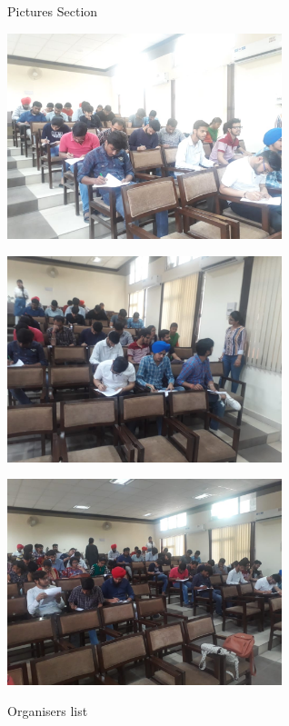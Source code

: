 \documentclass[12pt, a4 paper]{article}
\begin{document}
\begin{center}
\Huge Pictures Section

\medskip

\includegraphics[height=6cm]{image2.jpg}
\medskip

\includegraphics[height=6cm]{image3.jpg}
\medskip

\includegraphics[height=6cm]{image4.jpg}
\begin{center}

\end{center}


\huge Organisers list
\end{center}
\end{document}
